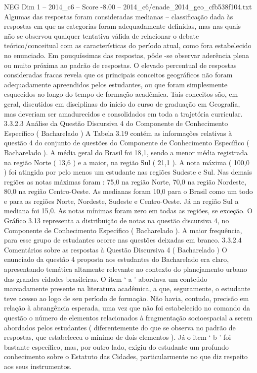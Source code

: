 \begin{textsample}{NEG Dim 1 – 2014\_c6 – Score -8.00 – 2014\_c6/enade\_2014\_geo\_cfb538f104.txt}
Algumas das respostas foram consideradas medianas – classificação dada às respostas em que as categorias foram adequadamente definidas, mas nas quais não se observou qualquer tentativa válida de relacionar o debate teórico/conceitual com as características do período atual, como fora estabelecido no enunciado.
Em pouquíssimas das respostas, pôde -se observar aderência plena ou muito próxima ao padrão de respostas.
O elevado percentual de respostas consideradas fracas revela que os principais conceitos geográficos não foram adequadamente apreendidos pelos estudantes, ou que foram simplesmente esquecidos ao longo do tempo de formação acadêmica.
Tais conceitos são, em geral, discutidos em disciplinas do início do curso de graduação em Geografia, mas deveriam ser amadurecidos e consolidados em toda a trajetória curricular. 3.3.2.3 Análise da Questão Discursiva 4 do Componente de Conhecimento Específico ( Bacharelado ) A Tabela 3.19 contém as informações relativas à questão 4 do conjunto de questões do Componente de Conhecimento Específico ( Bacharelado ).
A média geral do Brasil foi 18,1, sendo a menor média registrada na região Norte ( 13,6 ) e a maior, na região Sul ( 21,1 ).
A nota máxima ( 100,0 ) foi atingida por pelo menos um estudante nas regiões Sudeste e Sul.
Nas demais regiões as notas máximas foram : 75,0 na região Norte, 70,0 na região Nordeste, 80,0 na região Centro-Oeste.
As medianas foram 10,0 para o Brasil como um todo e para as regiões Norte, Nordeste, Sudeste e Centro-Oeste.
Já na região Sul a mediana foi 15,0.
As notas mínimas foram zero em todas as regiões, se exceção.
O Gráfico 3.13 representa a distribuição de notas na questão discursiva 4, no Componente de Conhecimento Específico ( Bacharelado ).
A maior frequência, para esse grupo de estudantes ocorre nas questões deixadas em branco. 3.3.2.4 Comentários sobre as respostas à Questão Discursiva 4 ( Bacharelado ) O enunciado da questão 4 proposta aos estudantes do Bacharelado era claro, apresentando temática altamente relevante no contexto do planejamento urbano das grandes cidades brasileiras.
O item ‘ a ’ abordava um conteúdo marcadamente presente na literatura acadêmica, a que, seguramente, o estudante teve acesso ao logo de seu período de formação.
Não havia, contudo, precisão em relação à abrangência esperada, uma vez que não foi estabelecido no comando da questão o número de elementos relacionados à fragmentação socioespacial a serem abordados pelos estudantes ( diferentemente do que se observa no padrão de respostas, que estabeleceu o mínimo de dois elementos ).
Já o item ‘ b ’ foi bastante específico, mas, por outro lado, exigiu do estudante um profundo conhecimento sobre o Estatuto das Cidades, particularmente no que diz respeito aos seus instrumentos.

\end{textsample}
